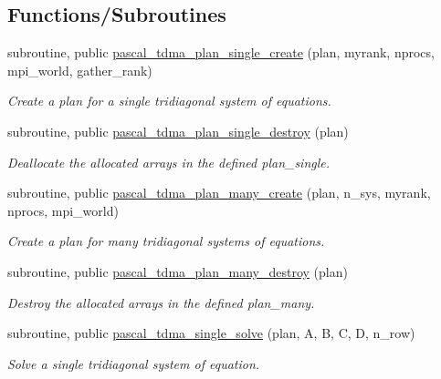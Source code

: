 \subsection*{Functions/\+Subroutines}
\begin{DoxyCompactItemize}
\item 
subroutine, public \mbox{\hyperlink{namespacepascal__tdma_a5dfc2d7c919b47ad364a74d141532a9f}{pascal\+\_\+tdma\+\_\+plan\+\_\+single\+\_\+create}} (plan, myrank, nprocs, mpi\+\_\+world, gather\+\_\+rank)
\begin{DoxyCompactList}\small\item\em Create a plan for a single tridiagonal system of equations. \end{DoxyCompactList}\item 
subroutine, public \mbox{\hyperlink{namespacepascal__tdma_adb04e59c740ce6c4b9518dd86eaeb594}{pascal\+\_\+tdma\+\_\+plan\+\_\+single\+\_\+destroy}} (plan)
\begin{DoxyCompactList}\small\item\em Deallocate the allocated arrays in the defined plan\+\_\+single. \end{DoxyCompactList}\item 
subroutine, public \mbox{\hyperlink{namespacepascal__tdma_a7e9c24b343ae949044eccc8692dcc6e9}{pascal\+\_\+tdma\+\_\+plan\+\_\+many\+\_\+create}} (plan, n\+\_\+sys, myrank, nprocs, mpi\+\_\+world)
\begin{DoxyCompactList}\small\item\em Create a plan for many tridiagonal systems of equations. \end{DoxyCompactList}\item 
subroutine, public \mbox{\hyperlink{namespacepascal__tdma_a8438e6774617871b147af9ec8bdad6ce}{pascal\+\_\+tdma\+\_\+plan\+\_\+many\+\_\+destroy}} (plan)
\begin{DoxyCompactList}\small\item\em Destroy the allocated arrays in the defined plan\+\_\+many. \end{DoxyCompactList}\item 
subroutine, public \mbox{\hyperlink{namespacepascal__tdma_ab14e132231d4b53fd65dd333ccc85a50}{pascal\+\_\+tdma\+\_\+single\+\_\+solve}} (plan, A, B, C, D, n\+\_\+row)
\begin{DoxyCompactList}\small\item\em Solve a single tridiagonal system of equation. \end{DoxyCompactList}\item 

\end{DoxyCompactItemize}

